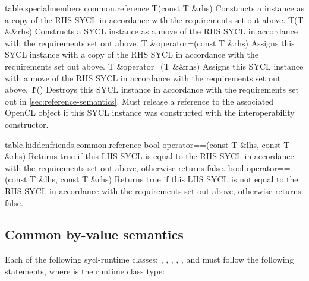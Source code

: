 
{table.specialmembers.common.reference}
  \addRow
    {T(const T \&rhs)}
    {
      Constructs a  instance as a copy of the RHS SYCL  in accordance with the requirements set out above.
    }
  \addRow
    {T(T \&\&rhs)}
    {
      Constructs a SYCL  instance as a move of the RHS SYCL  in accordance with the requirements set out above.
    }  
   \addRow
   {T \&operator=(const T \&rhs)}
   {
     Assigns this SYCL  instance with a copy of the RHS SYCL  in accordance with the requirements set out above.
   }
   \addRow
   {T \&operator=(T \&\&rhs)}
   {
     Assigns this SYCL  instance with a move of the RHS SYCL  in accordance with the requirements set out above.
   }
   \addRow
   {\~T()}
   {
     Destroys this SYCL  instance in accordance with the requirements set out in \ref{sec:reference-semantics}.
     Must release a reference to the associated OpenCL object if this SYCL  instance was constructed with the interoperability constructor.
   }
\completeTable

{table.hiddenfriends.common.reference}
   \addRow
   {bool operator==(const T \&lhs, const T \&rhs)}
   {
     Returns true if this LHS SYCL  is equal to the RHS SYCL  in accordance with the requirements set out above, otherwise returns false.
   }
   \addRow
   {bool operator==(const T \&lhs, const T \&rhs)}
   {
     Returns true if this LHS SYCL  is not equal to the RHS SYCL  in accordance with the requirements set out above, otherwise returns false.
   }
\completeTable

\subsection{Common by-value semantics}
\label{sec:byval-semantics}

Each of the following \gls{sycl-runtime} classes: , , , , ,  and  must follow the following statements, where  is the runtime class type:

